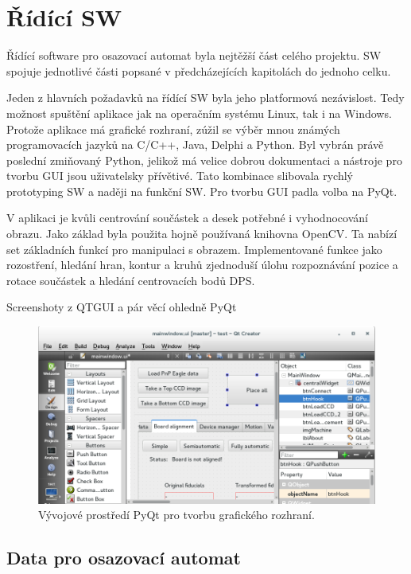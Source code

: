 \chapter{Řídící SW}

Řídící software pro osazovací automat byla nejtěžší část celého projektu. SW spojuje jednotlivé části popsané v předcházejících kapitolách do jednoho celku. 



Jeden z hlavních požadavků na řídící SW byla jeho platformová nezávislost. Tedy možnost spuštění aplikace jak na operačním systému Linux, tak i na Windows. Protože aplikace má grafické rozhraní, zúžil se výběr mnou známých programovacích jazyků na C/C++, Java, Delphi a Python. Byl vybrán  právě poslední zmiňovaný Python, jelikož má velice dobrou dokumentaci a nástroje pro tvorbu GUI jsou uživatelsky přívětivé.
Tato kombinace slibovala rychlý prototyping SW a naději na funkční SW. Pro tvorbu GUI padla volba na PyQt.

V aplikaci je kvůli centrování součástek a desek potřebné i vyhodnocování obrazu. Jako základ byla použita hojně používaná knihovna OpenCV. Ta nabízí set základních funkcí pro manipulaci s obrazem. Implementované funkce jako rozostření, hledání hran, kontur a kruhů zjednoduší úlohu rozpoznávání pozice a rotace součástek a hledání centrovacích bodů DPS.


Screenshoty z QTGUI a pár věcí ohledně PyQt
\begin{figure}[h!]
  \centering
    \includegraphics[width=1\linewidth]{obrazky/pyqt.png}%
    \caption{Vývojové prostředí PyQt pro tvorbu grafického rozhraní.}
\end{figure}







\section{Data pro osazovací automat}

